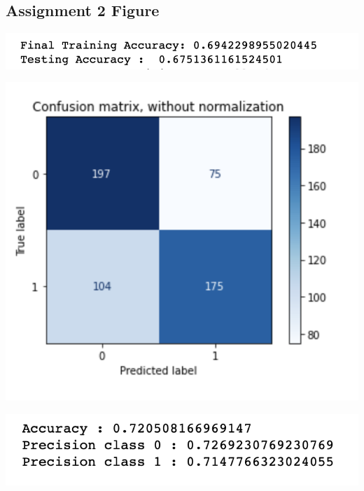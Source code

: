 \documentclass[12pt]{article}
\begin{document}
\begin{multicols*}{2}
  \subsection{Assignment 2 Figure} 
  \begin{center}

    \includegraphics[scale=0.5]{../screenshot/Non-Overlapping-Elastic-results/results.png}

    \includegraphics[scale=0.5]{../screenshot/Non-Overlapping-Elastic-results/cf.png}

    \includegraphics[scale=0.5]{../screenshot/Non-Overlapping-Elastic-results/calc_score.png}

  \end{center}


\end{multicols*}
\end{document}
